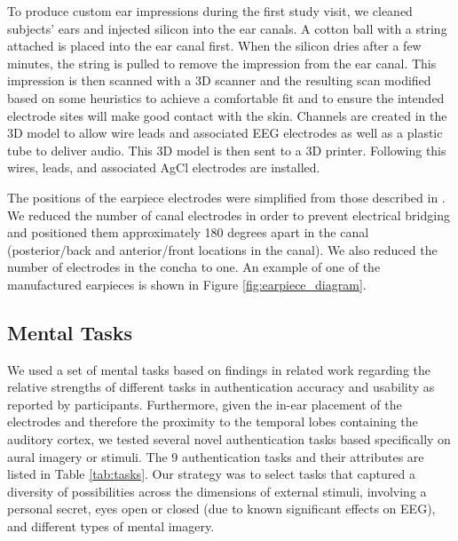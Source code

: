 \documentclass{sigchi}
\begin{document}
To produce custom ear impressions during the first study visit, we cleaned subjects' ears and injected silicon into the ear canals. A cotton ball with a string attached is placed into the ear canal first.  When the silicon dries after a few minutes, the string is pulled to remove the impression from the ear canal. This impression is then scanned with a 3D scanner and the resulting scan modified based on some heuristics to achieve a comfortable fit and to ensure the intended electrode sites will make good contact with the skin. Channels are created in the 3D model to allow wire leads and associated EEG electrodes as well as a plastic tube to deliver audio. This 3D model is then sent to a 3D printer. Following this wires, leads, and associated AgCl electrodes are installed. 

The positions of the earpiece electrodes were simplified from those described in \cite{Mikkelsen2015}. We reduced the number of canal electrodes in order to prevent electrical bridging and positioned them approximately 180 degrees apart in the canal (posterior/back and anterior/front locations in the canal). We also reduced the number of electrodes in the concha to one. An example of one of the manufactured earpieces is shown in Figure \ref{fig:earpiece_diagram}.

\subsection{Mental Tasks}

We used a set of mental tasks based on findings in related work regarding the relative strengths of different tasks in authentication accuracy and usability as reported by participants. Furthermore, given the in-ear placement of the electrodes and therefore the proximity to the temporal lobes containing the auditory cortex, we tested several novel authentication tasks based specifically on aural imagery or stimuli. The 9 authentication tasks and their attributes are listed in Table \ref{tab:tasks}. Our strategy was to select tasks that captured a diversity of possibilities across the dimensions of external stimuli, involving a personal secret, eyes open or closed (due to known significant effects on EEG), and different types of mental imagery.
\end{document}
